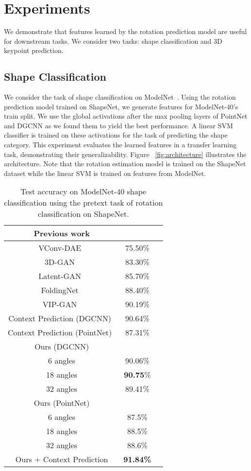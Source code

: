 \documentclass[10pt,twocolumn,letterpaper]{article}
\begin{document}
\section{Experiments}  

We demonstrate that features learned by the rotation prediction model are useful for downstream tasks. We consider two tasks: shape classification and 3D keypoint prediction. 

\subsection{Shape Classification}
We consider the task of shape classification on ModelNet~\cite{wu20153d}. 
Using the rotation prediction model trained on ShapeNet, we generate features for ModelNet-40's train split. We use the global activations after the max pooling layers of PointNet and DGCNN as we found them to yield the best performance. 
A linear SVM classifier is trained on these activations for the task of predicting the shape category. This experiment evaluates the learned features in a transfer learning task, demonstrating their generalizability. Figure ~\ref{fig:architecture} illustrates the architecture. Note that the rotation estimation model is trained on the ShapeNet dataset while the linear SVM is trained on features from ModelNet.   


\begin{table}
\begin{center}
\begin{tabular}{c c c}
\hline\hline
Previous work \\
\hline\hline
VConv-DAE~\cite{sharma2016vconv} & 75.50\% \\ 3D-GAN~\cite{wu2016learning} & 83.30\% \\ Latent-GAN~\cite{achlioptas2018learning} & 85.70\% \\ FoldingNet~\cite{yang2018foldingnet} & 88.40\% \\ VIP-GAN~\cite{han2019view} & 90.19\% \\ Context Prediction (DGCNN)~\cite{sauder2019context} & 90.64\% \\ Context Prediction (PointNet)~\cite{sauder2019context} & 87.31\% \\ \hline
\hline
Ours (DGCNN) \\
\hline
\hline
6 angles & 90.06\% \\ 18 angles & {\bf 90.75}\% \\ 32 angles & 89.41\% \\ \hline
\hline
Ours (PointNet) \\
\hline
\hline
6 angles & 87.5\% \\ 18 angles & 88.5\% \\ 32 angles & 88.6\% \\ \hline
\hline
Ours + Context Prediction & {\bf 91.84\%} \\
\hline
\hline
\end{tabular}
\end{center}
\caption{Test accuracy on ModelNet-40 shape classification using the pretext task of rotation classification on ShapeNet.  
}\label{tab:svm}
\end{table}
\end{document}
